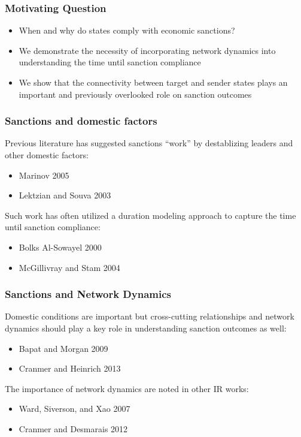 \begin{frame}
\titlepage
\end{frame}

\begin{frame}
\frametitle{Motivating Question}

\begin{itemize}
	\item When and why do states comply with economic sanctions? 
	\item We demonstrate the necessity of incorporating network dynamics into understanding the time until sanction compliance
	\item We show that the connectivity between target and sender states plays an important and previously overlooked role on sanction outcomes
\end{itemize}

\end{frame}

\begin{frame}
\frametitle{Sanctions and domestic factors}
Previous literature has suggested sanctions ``work'' by destablizing leaders and other domestic factors:
\begin{itemize}
	\item Marinov 2005
	\item Lektzian and Souva 2003
\end{itemize}

Such work has often utilized a duration modeling approach to capture the time until sanction compliance: 
\begin{itemize}
	\item Bolks Al-Sowayel 2000
	\item McGillivray and Stam 2004
\end{itemize}


\end{frame}

\begin{frame}
\frametitle{Sanctions and Network Dynamics}
Domestic conditions are important but cross-cutting relationships and network dynamics should play a key role in understanding sanction outcomes as well:
\begin{itemize}
	\item Bapat and Morgan 2009
	\item Cranmer and Heinrich 2013
\end{itemize}

The importance of network dynamics are noted in other IR works:
\begin{itemize}
	\item Ward, Siverson, and Xao 2007
	\item Cranmer and Desmarais 2012
\end{itemize} 
\end{frame}

